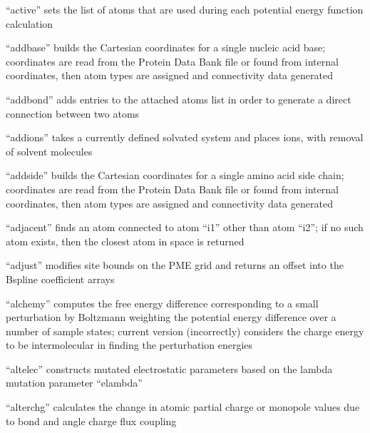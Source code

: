 \documentclass[letterpaper,11pt,english]{sphinxmanual}
\begin{document}

“active” sets the list of atoms that are used during
each potential energy function calculation


“addbase” builds the Cartesian coordinates for a single nucleic
acid base; coordinates are read from the Protein Data Bank file
or found from internal coordinates, then atom types are assigned
and connectivity data generated


“addbond” adds entries to the attached atoms list in
order to generate a direct connection between two atoms


“addions” takes a currently defined solvated system and
places ions, with removal of solvent molecules


“addside” builds the Cartesian coordinates for a single amino
acid side chain; coordinates are read from the Protein Data
Bank file or found from internal coordinates, then atom types
are assigned and connectivity data generated


“adjacent” finds an atom connected to atom “i1” other than
atom “i2”; if no such atom exists, then the closest atom
in space is returned


“adjust” modifies site bounds on the PME grid and returns
an offset into the B\sphinxhyphen{}spline coefficient arrays


“alchemy” computes the free energy difference corresponding
to a small perturbation by Boltzmann weighting the potential
energy difference over a number of sample states; current
version (incorrectly) considers the charge energy to be
intermolecular in finding the perturbation energies


“altelec” constructs mutated electrostatic parameters based
on the lambda mutation parameter “elambda”


“alterchg” calculates the change in atomic partial charge or
monopole values due to bond and angle charge flux coupling
\end{document}
